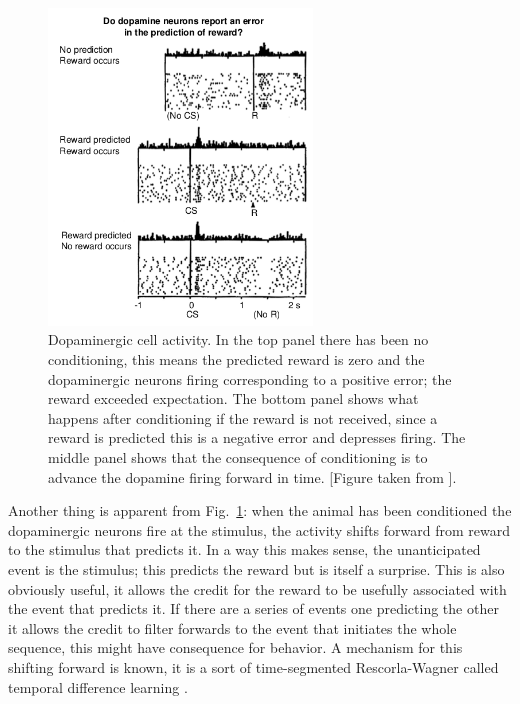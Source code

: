 \documentclass[11pt,a4paper]{scrartcl}
\begin{document}
\begin{figure}
\begin{center}
\includegraphics[width=7cm]{Schultz.png}
\end{center}
\caption{Dopaminergic cell activity. In the top panel there has been
  no conditioning, this means the predicted reward is zero and the
  dopaminergic neurons firing corresponding to a positive error; the
  reward exceeded expectation. The bottom panel shows what happens
  after conditioning if the reward is not received, since a reward is
  predicted this is a negative error and depresses firing. The middle
  panel shows that the consequence of conditioning is to advance the
  dopamine firing forward in time. [Figure taken from \cite{SchultzDayanMontague1997a}]. \label{fig:spikes}}
\end{figure}

Another thing is apparent from Fig.~\ref{fig:spikes}: when the animal
has been conditioned the dopaminergic neurons fire at the stimulus,
the activity shifts forward from reward to the stimulus that predicts
it. In a way this makes sense, the unanticipated event is the
stimulus; this predicts the reward but is itself a surprise. This is
also obviously useful, it allows the credit for the reward to be
usefully associated with the event that predicts it. If there are a
series of events one predicting the other it allows the credit to
filter forwards to the event that initiates the whole sequence, this
might have consequence for behavior. A mechanism for this shifting
forward is known, it is a sort of time-segmented Rescorla-Wagner
called temporal difference learning
\cite{Sutton1988a,SuttonBarto1998a}.

\end{document}
